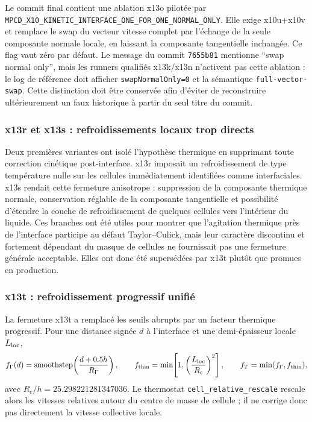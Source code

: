 \documentclass[11pt,a4paper]{article}
\begin{document}
Le commit final contient une ablation x13o pilotée par \nolinkurl{MPCD_X10_KINETIC_INTERFACE_ONE_FOR_ONE_NORMAL_ONLY}. Elle exige x10u+x10v et remplace le swap du vecteur vitesse complet par l'échange de la seule composante normale locale, en laissant la composante tangentielle inchangée. Ce flag vaut zéro par défaut. Le message du commit \texttt{7655b81} mentionne ``swap normal only'', mais les runners qualifiés x13k/x13n n'activent pas cette ablation : le log de référence doit afficher \texttt{swapNormalOnly=0} et la sémantique \texttt{full-vector-swap}. Cette distinction doit être conservée afin d'éviter de reconstruire ultérieurement un faux historique à partir du seul titre du commit.

\subsubsection{x13r et x13s : refroidissements locaux trop directs}

Deux premières variantes ont isolé l'hypothèse thermique en supprimant toute correction cinétique post-interface. x13r imposait un refroidissement de type température nulle sur les cellules immédiatement identifiées comme interfaciales. x13s rendait cette fermeture anisotrope : suppression de la composante thermique normale, conservation réglable de la composante tangentielle et possibilité d'étendre la couche de refroidissement de quelques cellules vers l'intérieur du liquide. Ces branches ont été utiles pour montrer que l'agitation thermique près de l'interface participe au défaut Taylor--Culick, mais leur caractère discontinu et fortement dépendant du masque de cellules ne fournissait pas une fermeture générale acceptable. Elles ont donc été supersédées par x13t plutôt que promues en production.

\subsubsection{x13t : refroidissement progressif unifié}

La fermeture x13t a remplacé les seuils abrupts par un facteur thermique progressif. Pour une distance signée $d$ à l'interface et une demi-épaisseur locale $L_{\rm loc}$,
\begin{equation}
 f_\Gamma(d)=\operatorname{smoothstep}\!\left(\frac{d+0.5h}{R_\Gamma}\right),
 \qquad
 f_{\rm thin}=\min\!\left[1,\left(\frac{L_{\rm loc}}{R_c}\right)^2\right],
 \qquad
 f_T=\min(f_\Gamma,f_{\rm thin}),
\end{equation}
avec $R_c/h=25.298221281347036$. Le thermostat \texttt{cell\_relative\_rescale} rescale alors les vitesses relatives autour du centre de masse de cellule ; il ne corrige donc pas directement la vitesse collective locale.
\end{document}
